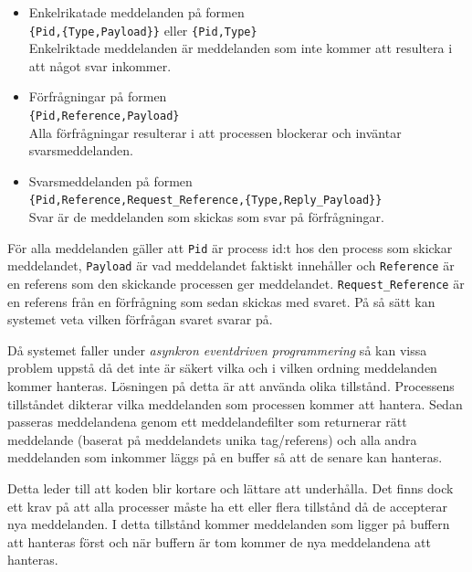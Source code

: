 \documentclass[12pt]{article}
\begin{document}
\begin{itemize}
    \item Enkelrikatade meddelanden på formen \\
    \texttt{\{Pid,\{Type,Payload\}\}} eller \texttt{\{Pid,Type\}} \\
    Enkelriktade meddelanden är meddelanden som inte kommer att resultera i att något svar inkommer.
    \item Förfrågningar på formen \\
    \texttt{\{Pid,Reference,Payload\}} \\
    Alla förfrågningar resulterar i att processen blockerar och inväntar svarsmeddelanden.
    \item Svarsmeddelanden på formen \\
    \texttt{\{Pid,Reference,Request\_Reference,\{Type,Reply\_Payload\}\}} \\
    Svar är de meddelanden som skickas som svar på förfrågningar.
\end{itemize}

För alla meddelanden gäller att \texttt{Pid} är process id:t hos den process som skickar meddelandet,
\texttt{Payload} är vad meddelandet faktiskt innehåller och \texttt{Reference} är en referens som den skickande processen ger meddelandet.
\texttt{Request\_Reference} är en referens från en förfrågning som sedan skickas med svaret.
På så sätt kan systemet veta vilken förfrågan svaret svarar på.

Då systemet faller under \textit{asynkron eventdriven programmering} så kan vissa problem uppstå då det inte är säkert vilka och i vilken ordning meddelanden kommer hanteras.
Lösningen på detta är att använda olika tillstånd.
Processens tillståndet dikterar vilka meddelanden som processen kommer att hantera.
Sedan passeras meddelandena genom ett meddelandefilter som returnerar rätt meddelande (baserat på meddelandets unika tag/referens) och alla andra meddelanden som inkommer läggs på en buffer så att de senare kan hanteras.

Detta leder till att koden blir kortare och lättare att underhålla.
Det finns dock ett krav på att alla processer måste ha ett eller flera tillstånd då de accepterar nya meddelanden.
I detta tillstånd kommer meddelanden som ligger på buffern att hanteras först och när buffern är tom kommer de nya meddelandena att hanteras.
\end{document}
